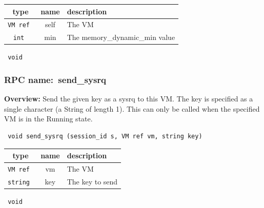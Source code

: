 
 
\vspace{0.3cm}
\begin{tabular}{|c|c|p{7cm}|}
 \hline
{\bf type} & {\bf name} & {\bf description} \\ \hline
{\tt VM ref } & self & The VM \\ \hline 

{\tt int } & min & The memory\_dynamic\_min value \\ \hline 

\end{tabular}

\vspace{0.3cm}

{\tt 
void
}



\vspace{0.3cm}
\vspace{0.3cm}
\vspace{0.3cm}
\subsubsection{RPC name:~send\_sysrq}

{\bf Overview:} 
Send the given key as a sysrq to this VM.  The key is specified as a single
character (a String of length 1).  This can only be called when the
specified VM is in the Running state.

\begin{verbatim} void send_sysrq (session_id s, VM ref vm, string key)\end{verbatim}



 
\vspace{0.3cm}
\begin{tabular}{|c|c|p{7cm}|}
 \hline
{\bf type} & {\bf name} & {\bf description} \\ \hline
{\tt VM ref } & vm & The VM \\ \hline 

{\tt string } & key & The key to send \\ \hline 

\end{tabular}

\vspace{0.3cm}

{\tt 
void
}



